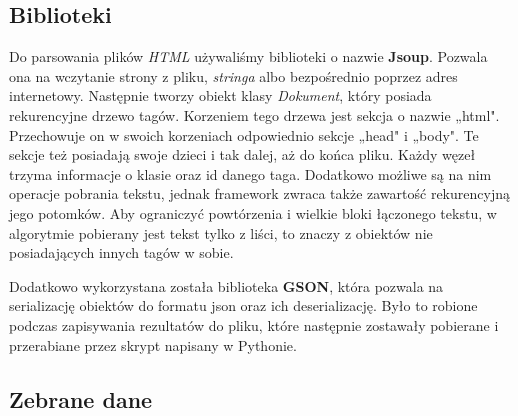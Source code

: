\subsection{Biblioteki}
\label{sec:3.1.3}

Do parsowania plików \emph{HTML} używaliśmy biblioteki o nazwie \textbf{Jsoup}. Pozwala ona na wczytanie strony z pliku, \emph{stringa} albo bezpośrednio poprzez adres internetowy. Następnie tworzy obiekt klasy \emph{Dokument}, który posiada rekurencyjne drzewo tagów. Korzeniem tego drzewa jest sekcja o nazwie „html". Przechowuje on w swoich korzeniach odpowiednio sekcje „head" i „body". Te sekcje też posiadają swoje dzieci i tak dalej, aż do końca pliku. Każdy węzeł trzyma informacje o klasie oraz id danego taga. Dodatkowo możliwe są na nim operacje pobrania tekstu, jednak framework zwraca także zawartość rekurencyjną jego potomków. Aby ograniczyć powtórzenia i wielkie bloki łączonego tekstu, w algorytmie pobierany jest tekst tylko z liści, to znaczy z obiektów nie posiadających innych tagów w sobie.

Dodatkowo wykorzystana została biblioteka \textbf{GSON},  która pozwala na serializację obiektów do formatu json oraz ich deserializację. Było to robione podczas zapisywania rezultatów do pliku, które następnie zostawały pobierane i przerabiane przez skrypt napisany w Pythonie.


\subsection{Zebrane dane}
\label{sec:3.1.4}

